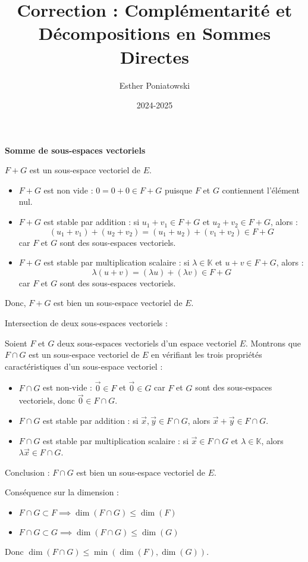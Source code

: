 \documentclass[10pt,a4paper]{article}
\title{Correction : Complémentarité et Décompositions en Sommes Directes}
\author{Esther Poniatowski}
\date{2024-2025}
\begin{document}
\textbf{Somme de sous-espaces vectoriels}

\q $F+G$ est un sous-espace vectoriel de $E$.

\begin{itemize}
    \item $F+G$ est non vide : $0 = 0 + 0 \in F+G$ puisque $F$ et $G$ contiennent l'élément nul.
    \item  $F+G$ est stable par addition : si $u_1 + v_1 \in F+G$ et $u_2 + v_2 \in F+G$, alors :
   \[
   (u_1 + v_1) + (u_2 + v_2) = (u_1 + u_2) + (v_1 + v_2) \in F+G
   \]
   car $F$ et $G$ sont des sous-espaces vectoriels.
   \item $F+G$ est stable par multiplication scalaire : si $\lambda \in \mathbb{K}$ et $u + v \in
   F+G$, alors :
   \[
   \lambda (u + v) = (\lambda u) + (\lambda v) \in F+G
   \]
   car $F$ et $G$ sont des sous-espaces vectoriels.
\end{itemize}

Donc, $F+G$ est bien un sous-espace vectoriel de $E$.

\q Intersection de deux sous-espaces vectoriels :

Soient $F$ et $G$ deux sous-espaces vectoriels d'un espace vectoriel $E$. Montrons que $F \cap
G$ est un sous-espace vectoriel de $E$ en vérifiant les trois propriétés caractéristiques d'un
sous-espace vectoriel :

\begin{itemize}
    \item $F \cap G$ est non-vide : $\vec{0} \in F$ et $\vec{0} \in G$ car $F$ et $G$
    sont des sous-espaces vectoriels, donc $\vec{0} \in F \cap G$.
    \item $F \cap G$ est stable par addition : si $\vec{x}, \vec{y} \in F \cap G$, alors $\vec{x} +
    \vec{y} \in F \cap G$.
    \item $F \cap G$ est stable par multiplication scalaire : si $\vec{x} \in F \cap G$ et $\lambda
    \in \mathbb{K}$, alors $\lambda\vec{x} \in F \cap G$.
\end{itemize}

Conclusion : $F \cap G$ est bien un sous-espace vectoriel de $E$.

Conséquence sur la dimension :
\begin{itemize}
    \item $F \cap G \subset F \implies \dim(F \cap G) \leq \dim(F)$
    \item $F \cap G \subset G \implies \dim(F \cap G) \leq \dim(G)$
\end{itemize}
Donc $\dim(F \cap G) \leq \min(\dim(F), \dim(G))$.
\end{document}

